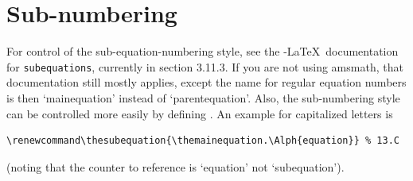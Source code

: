 \documentclass[DIV=9, pagesize=auto]{scrartcl}
\newcommand*{\cmd}[1]{\texttt{\string#1}}
\newcommand*{\env}[1]{\texttt{#1}}
\begin{document}
\section*{Sub-numbering}
For control of the sub-equation-numbering style, see the
\AmS-\LaTeX\ documentation for \env{subequations}, currently 
in section 3.11.3. If you are not using amsmath, that documentation
still mostly applies, except the name for regular equation numbers
is then `mainequation' instead of `parentequation'. Also, the
sub-numbering style can be controlled more easily by defining
\cmd{\thesubequation}. An example for capitalized letters is
\begin{verbatim}
\renewcommand\thesubequation{\themainequation.\Alph{equation}} % 13.C
\end{verbatim}
(noting that the counter to reference is `equation' not `subequation').
\end{document}
